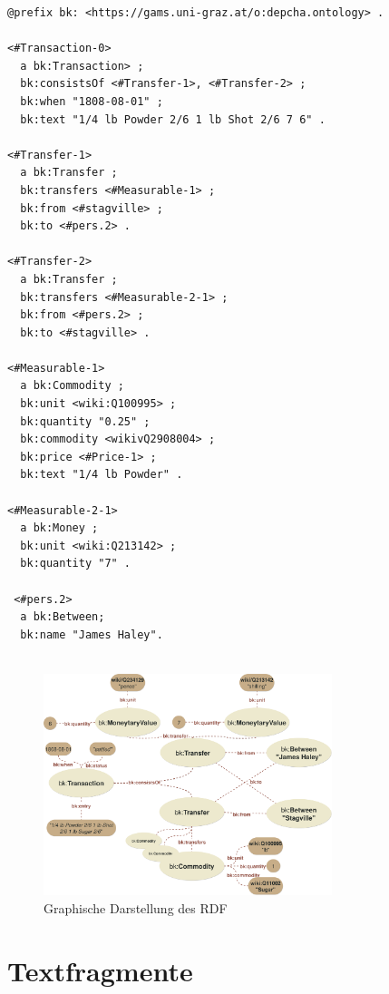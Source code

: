 \documentclass[12pt,a4paper]{article}
\begin{document}
\begin{lstlisting}[]
@prefix bk: <https://gams.uni-graz.at/o:depcha.ontology> .

<#Transaction-0>
  a bk:Transaction> ;
  bk:consistsOf <#Transfer-1>, <#Transfer-2> ;
  bk:when "1808-08-01" ;
  bk:text "1/4 lb Powder 2/6 1 lb Shot 2/6 7 6" .

<#Transfer-1>
  a bk:Transfer ;
  bk:transfers <#Measurable-1> ;
  bk:from <#stagville> ;
  bk:to <#pers.2> .

<#Transfer-2>
  a bk:Transfer ;
  bk:transfers <#Measurable-2-1> ;
  bk:from <#pers.2> ;
  bk:to <#stagville> .

<#Measurable-1>
  a bk:Commodity ;
  bk:unit <wiki:Q100995> ;
  bk:quantity "0.25" ;
  bk:commodity <wikivQ2908004> ;
  bk:price <#Price-1> ;
  bk:text "1/4 lb Powder" .

<#Measurable-2-1>
  a bk:Money ;
  bk:unit <wiki:Q213142> ;
  bk:quantity "7" .
  
 <#pers.2>
  a bk:Between;
  bk:name "James Haley".
  
\end{lstlisting}

\begin{figure}[H]
\centering
	\includegraphics[width=0.75\textwidth]{img/example.png}  
    \caption[Graphische Darstellung des RDF, eigene Darstellung, 01.06.2019.]{Graphische Darstellung des RDF} \label{fig:example}
\end{figure}

\section{Textfragmente}
\end{document}
